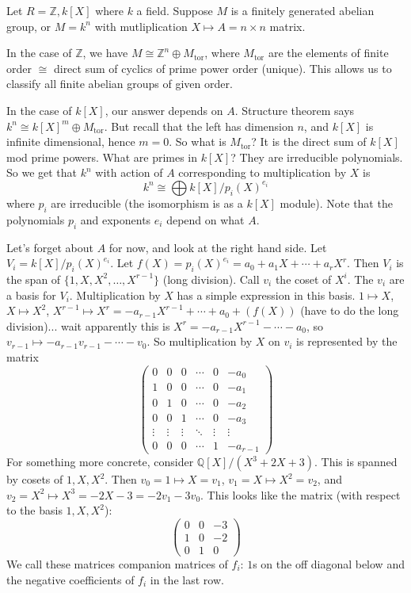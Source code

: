 \documentclass{article}
\theoremstyle{plain}
\theoremstyle{remark}
\newcommand{\Z}{{\mathbb Z}}
\newcommand{\Q}{{\mathbb Q}}
\begin{document}
Let $R = \Z, k[X]$ where $k$ a field.
Suppose $M$ is a finitely generated abelian group,
or $M = k^n$ with mutliplication $X \mapsto A= n \times n$ matrix.

In the case of $\Z$, we have $M \cong \Z^n \oplus M_{\text{tor}}$,
where $M_{\text{tor}}$ are the elements of finite order
$\cong $ direct sum of cyclics of prime power order (unique).
This allows us to classify all finite abelian groups of given order.

In the case of $k[X]$, our answer depends on $A$.
Structure theorem says $k^n \cong k[X]^m \oplus M_{\text{tor}}$.
But recall that the left has dimension $n$, and $k[X]$ is infinite dimensional,
hence $m = 0$.
So what is $M_{\text{tor}}$?
It is the direct sum of $k[X]$ mod prime powers.
What are primes in $k[X]$? They are irreducible polynomials.
So we get that $k^n$ with action of $A$ corresponding to multiplication by $X$ is
\[
	k^n \cong \bigoplus k[X]/p_i(X)^{e_i}
\]
where $p_i$ are irreducible
(the isomorphism is as a $k[X]$ module).
Note that the polynomials $p_i$ and exponents $e_i$ depend on what $A$.

Let's forget about $A$ for now, and look at the right hand side.
Let $V_i = k[X]/p_i(X)^{e_i}$.
Let $f(X) = p_i(X)^{e_i} = a_0 + a_1X + \cdots + a_rX^r$.
Then $V_i$ is the span of $\{1,X,X^2,\dots,X^{r-1}\}$ (long division).
Call $v_i$ the coset of $X^i$.
The $v_i$ are a basis for $V_i$.
Multiplication by $X$ has a simple expression in this basis.
$1 \mapsto X$, $X \mapsto X^2$, $X^{r-1} \mapsto X^r = -a_{r-1}X^{r-1} + \cdots + a_0 + (f(X))$
(have to do the long division)...
wait apparently this is $X^r = -a_{r-1}X^{r-1} - \cdots - a_0$,
so $v_{r-1} \mapsto -a_{r-1}v_{r-1} - \cdots - v_0$.
So multiplication by $X$ on $v_i$ is represented by the matrix
\[
	\begin{pmatrix}
		0 & 0 & 0 & \cdots & 0 & -a_0\\
		1 & 0 & 0 & \cdots & 0 & -a_1\\
		0 & 1 & 0 & \cdots & 0 & -a_2\\
		0 & 0 & 1 & \cdots & 0 & -a_3\\
		\vdots & \vdots & \vdots & \ddots & \vdots & \vdots\\
		0 & 0 & 0 & \cdots & 1 & -a_{r-1}
	\end{pmatrix}
\]
For something more concrete, consider $\Q[X]/(X^3+2X+3)$.
This is spanned by cosets of $1,X,X^2$.
Then $v_0 = 1 \mapsto X = v_1$, $v_1 = X \mapsto X^2 = v_2$,
and $v_2 = X^2 \mapsto X^3 = -2X - 3 = -2v_1 - 3v_0$.
This looks like the matrix (with respect to the basis $1,X,X^2$):
\[
	\begin{pmatrix}
		0 & 0 & -3\\
		1 & 0 & -2\\
		0 & 1 & 0
	\end{pmatrix}
\]
We call these matrices companion matrices of $f_i$:
$1$s on the off diagonal below and the negative coefficients of $f_i$ in the last row.
\end{document}
